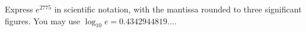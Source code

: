Express $e^{2775}$ in scientific notation, with the mantissa rounded to three significant figures. You may use $\log_{10}e=0.4342944819\ldots$.
